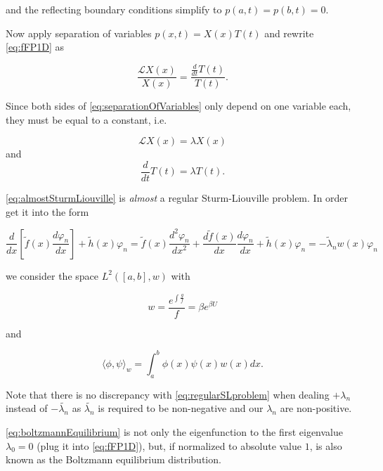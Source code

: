and the reflecting boundary conditions simplify to $p(a,t)=p(b,t)=0$.

Now apply separation of variables $p(x,t)=X(x)T(t)$ and rewrite \eqref{eq:fFP1D} as

\begin{equation}\label{eq:separationOfVariables}
\frac{\mathcal{L}X(x)}{X(x)} = \frac{\frac{d}{dt}T(t)}{T(t)}.
\end{equation}

Since both sides of \eqref{eq:separationOfVariables} only depend on one variable each, they must be equal to a constant, i.e.

\begin{equation}\label{eq:almostSturmLiouville}
\mathcal{L}X(x) = \lambda X(x)
\end{equation}
and
\begin{equation*}
\frac{d}{dt}T(t)=\lambda T(t).
\end{equation*}

\eqref{eq:almostSturmLiouville} is \textit{almost} a regular Sturm-Liouville problem. In order get it into the form

\begin{equation}\label{eq:regularSLproblem}
\frac{d}{dx}\left[\tilde{f}(x)\frac{d\varphi_n}{dx} \right] + \tilde{h}(x)\varphi_n = \tilde{f}(x)\frac{d^2 \varphi_n}{dx^2} + \frac{d \tilde{f}(x)}{dx}\frac{d \varphi_n}{dx}+ \tilde{h}(x)\varphi_n = -\tilde{\lambda}_n w(x)\varphi_n
\end{equation}

we consider the space $L^2([a,b],w)$ with 

\begin{equation}\label{eq:boltzmannEquilibrium}
w = \frac{e^{\int \frac{g}{f}}}{f} = \beta e^{\beta U}
\end{equation}

and 

\begin{equation*}
\langle \phi, \psi \rangle_w = \int_a^b \phi(x)\psi(x)w(x)dx.
\end{equation*}

Note that there is no discrepancy with \eqref{eq:regularSLproblem} when dealing $+\lambda_n$ instead of $-\tilde{\lambda_n}$ as $\tilde{\lambda_n}$ is required to be non-negative and our $\lambda_n$ are non-positive.

\eqref{eq:boltzmannEquilibrium} is not only the eigenfunction to the first eigenvalue $\lambda_0 = 0$ (plug it into \eqref{eq:fFP1D}), but, if normalized to absolute value $1$, is also known as the Boltzmann equilibrium distribution.

